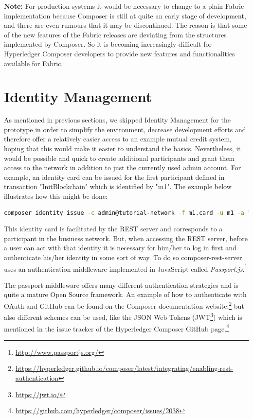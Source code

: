 \textbf{Note:} For production systems it would be necessary to change to a plain Fabric implementation because Composer is still at quite an early stage of development, and there are even rumours that it may be discontinued. The reason is that some of the new features of the Fabric releases are deviating from the structures implemented by Composer. So it is becoming increasingly difficult for Hyperledger Composer developers to provide new features and functionalities available for Fabric.

\section{Identity Management}
\label{sec:id-management}

As mentioned in previous sections, we skipped Identity Management for the prototype in order to simplify the environment, decrease development efforts and therefore offer a relatively easier access to an example mutual credit system, hoping that this would make it easier to understand the basics. Nevertheless, it would be possible and quick to create additional participants and grant them access to the network in addition to just the currently used admin account. For example, an identity card can be issued for the first participant defined in transaction "InitBlockchain" which is identified by "m1". The example below illustrates how this might be done:

\begin{lstlisting}[language=bash]
	composer identity issue -c admin@tutorial-network -f m1.card -u m1 -a "resource:net.sardex.interlace.Individual#m1" -x true 
\end{lstlisting}

This identity card is facilitated by the REST server and corresponds to a participant in the business network. 
But, when accessing the REST server, before a user can act with that identity it is necessary for him/her to log in first and authenticate his/her identity in some sort of way. To do so composer-rest-server uses an authentication middleware implemented in JavaScript called \textit{Passport.js}.\footnote{\url{http://www.passportjs.org/}}

The passport middleware offers many different authentication strategies and is quite a mature Open Source framework. An example of how to authenticate with OAuth and GitHub can be found on the Composer documentation website;\footnote{\url{https://hyperledger.github.io/composer/latest/integrating/enabling-rest-authentication}} but also different schemes can be used, like the JSON Web Tokens (JWT\footnote{\url{https://jwt.io/}}) which is mentioned in the issue tracker of the Hyperledger Composer GitHub page.\footnote{\url{https://github.com/hyperledger/composer/issues/2038}}

